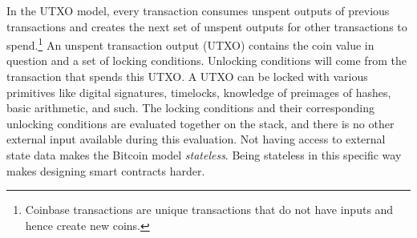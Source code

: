 In the UTXO model, every transaction consumes unspent outputs of previous transactions and creates the next set of unspent outputs for other transactions to spend.\footnote{Coinbase transactions are unique transactions that do not have inputs and hence create new coins.} An unspent transaction output (UTXO) contains the coin value in question and a set of locking conditions. Unlocking conditions will come from the transaction that spends this UTXO. A UTXO can be locked with various primitives like digital signatures, timelocks, knowledge of preimages of hashes, basic arithmetic, and such. The locking conditions and their corresponding unlocking conditions are evaluated together on the stack, and there is no other external input available during this evaluation. Not having access to external state data makes the Bitcoin model \textit{stateless}. Being stateless in this specific way makes designing smart contracts harder.

